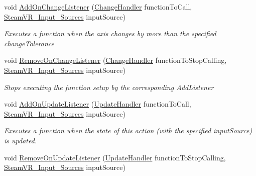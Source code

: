 \begin{DoxyCompactItemize}
void \mbox{\hyperlink{class_valve_1_1_v_r_1_1_steam_v_r___action___vector2_a6ed8ca5d8b3b60d52a8c7d875506d3ad}{Add\+On\+Change\+Listener}} (\mbox{\hyperlink{class_valve_1_1_v_r_1_1_steam_v_r___action___vector2_ad390de62736aedd5be93238b1840ffec}{Change\+Handler}} function\+To\+Call, \mbox{\hyperlink{namespace_valve_1_1_v_r_a82e5bf501cc3aa155444ee3f0662853f}{Steam\+V\+R\+\_\+\+Input\+\_\+\+Sources}} input\+Source)
\begin{DoxyCompactList}\small\item\em Executes a function when the axis changes by more than the specified change\+Tolerance \end{DoxyCompactList}\item 
void \mbox{\hyperlink{class_valve_1_1_v_r_1_1_steam_v_r___action___vector2_a7449f5403cd5c68579091d9ab4f6084f}{Remove\+On\+Change\+Listener}} (\mbox{\hyperlink{class_valve_1_1_v_r_1_1_steam_v_r___action___vector2_ad390de62736aedd5be93238b1840ffec}{Change\+Handler}} function\+To\+Stop\+Calling, \mbox{\hyperlink{namespace_valve_1_1_v_r_a82e5bf501cc3aa155444ee3f0662853f}{Steam\+V\+R\+\_\+\+Input\+\_\+\+Sources}} input\+Source)
\begin{DoxyCompactList}\small\item\em Stops executing the function setup by the corresponding Add\+Listener \end{DoxyCompactList}\item 
void \mbox{\hyperlink{class_valve_1_1_v_r_1_1_steam_v_r___action___vector2_a12df05b3e447aaa26cc81b9ccae3cd2c}{Add\+On\+Update\+Listener}} (\mbox{\hyperlink{class_valve_1_1_v_r_1_1_steam_v_r___action___vector2_a3f6872fd8960cbb9f571b0362857d9b5}{Update\+Handler}} function\+To\+Call, \mbox{\hyperlink{namespace_valve_1_1_v_r_a82e5bf501cc3aa155444ee3f0662853f}{Steam\+V\+R\+\_\+\+Input\+\_\+\+Sources}} input\+Source)
\begin{DoxyCompactList}\small\item\em Executes a function when the state of this action (with the specified input\+Source) is updated. \end{DoxyCompactList}\item 
void \mbox{\hyperlink{class_valve_1_1_v_r_1_1_steam_v_r___action___vector2_a615865386254c66852cf687a8e330c3c}{Remove\+On\+Update\+Listener}} (\mbox{\hyperlink{class_valve_1_1_v_r_1_1_steam_v_r___action___vector2_a3f6872fd8960cbb9f571b0362857d9b5}{Update\+Handler}} function\+To\+Stop\+Calling, \mbox{\hyperlink{namespace_valve_1_1_v_r_a82e5bf501cc3aa155444ee3f0662853f}{Steam\+V\+R\+\_\+\+Input\+\_\+\+Sources}} input\+Source)

\end{DoxyCompactItemize}
